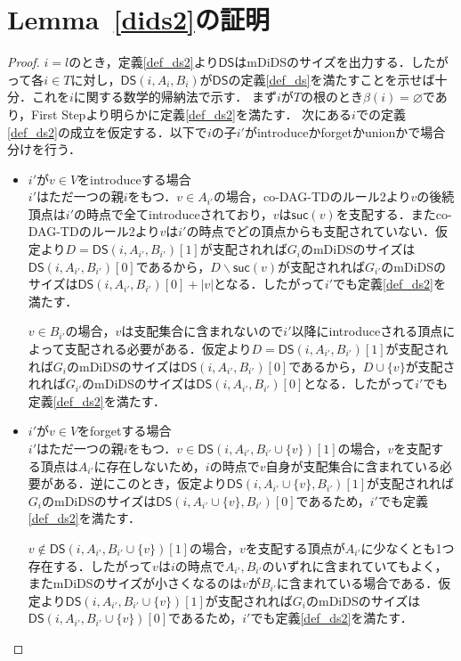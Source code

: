 \documentclass[master]{kuisthesis}		%
\theoremstyle{plain}
\theoremstyle{definition}
\begin{document}
\section{Lemma~\ref{dids2}の証明}



\begin{proof}
    $i=l$のとき，定義\ref{def_ds2}より$\mathsf{DS}$はmDiDSのサイズを出力する．したがって各$i \in T$に対し，$\mathsf{DS}(i, A_i, B_i)$が$\mathsf{DS}$の定義\ref{def_ds}を満たすことを示せば十分．これを$i$に関する数学的帰納法で示す．
    まず$i$が$T$の根のとき$\beta(i) = \varnothing$であり，First Stepより明らかに定義\ref{def_ds2}を満たす．
    次にある$i$での定義\ref{def_ds2}の成立を仮定する．以下で$i$の子$i'$がintroduceかforgetかunionかで場合分けを行う．
    \begin{itemize}
        \item $i'$が$v \in V$をintroduceする場合 \\
        $i'$はただ一つの親$i$をもつ．$v \in A_{i'}$の場合，co-DAG-TDのルール2より$v$の後続頂点は$i'$の時点で全てintroduceされており，$v$は$\mathsf{suc}(v)$を支配する．またco-DAG-TDのルール2より$v$は$i'$の時点でどの頂点からも支配されていない．仮定より$D = \mathsf{DS}(i, A_{i'}, B_{i'})[1]$が支配されれば$G_i$のmDiDSのサイズは$\mathsf{DS}(i, A_{i'}, B_{i'})[0]$であるから，$D \backslash \mathsf{suc}(v)$が支配されれば$G_{i'}$のmDiDSのサイズは$\mathsf{DS}(i, A_{i'}, B_{i'})[0] + |v|$となる．したがって$i'$でも定義\ref{def_ds2}を満たす．

        $v \in B_{i'}$の場合，$v$は支配集合に含まれないので$i'$以降にintroduceされる頂点によって支配される必要がある．仮定より$D = \mathsf{DS}(i, A_{i'}, B_{i'})[1]$が支配されれば$G_i$のmDiDSのサイズは$\mathsf{DS}(i, A_{i'}, B_{i'})[0]$であるから，$D \cup \{v\}$が支配されれば$G_{i'}$のmDiDSのサイズは$\mathsf{DS}(i, A_{i'}, B_{i'})[0]$となる．したがって$i'$でも定義\ref{def_ds2}を満たす．
        
        \item $i'$が$v \in V$をforgetする場合 \\
        $i'$はただ一つの親$i$をもつ．$v \in \mathsf{DS}(i, A_{i'}, B_{i'} \cup \{v\})[1]$の場合，$v$を支配する頂点は$A_{i'}$に存在しないため，$i$の時点で$v$自身が支配集合に含まれている必要がある．逆にこのとき，仮定より$\mathsf{DS}(i, A_{i'} \cup \{v\}, B_{i'})[1]$が支配されれば$G_i$のmDiDSのサイズは$\mathsf{DS}(i, A_{i'} \cup \{v\}, B_{i'})[0]$であるため，$i'$でも定義\ref{def_ds2}を満たす．

        $v \notin \mathsf{DS}(i, A_{i'}, B_{i'} \cup \{v\})[1]$の場合，$v$を支配する頂点が$A_{i'}$に少なくとも1つ存在する．したがって$v$は$i$の時点で$A_{i'}, B_{i'}$のいずれに含まれていてもよく，またmDiDSのサイズが小さくなるのは$v$が$B_{i'}$に含まれている場合である．仮定より$\mathsf{DS}(i, A_{i'}, B_{i'} \cup \{v\})[1]$が支配されれば$G_i$のmDiDSのサイズは$\mathsf{DS}(i, A_{i'}, B_{i'} \cup \{v\})[0]$であるため，$i'$でも定義\ref{def_ds2}を満たす．


\end{itemize}
\end{proof}
\end{document}
